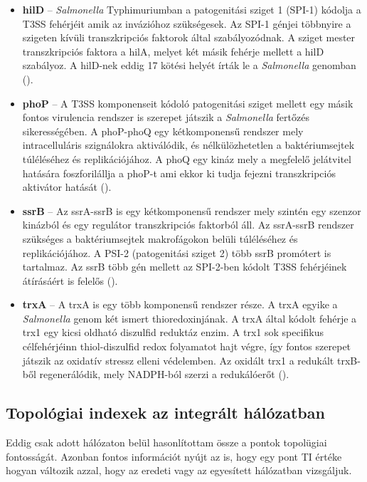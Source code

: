 \documentclass[a4paper,12pt]{article}
\begin{document}
			\begin{itemize}
				\item \textbf{hilD} -- \textit{Salmonella} Typhimuriumban a patogenitási sziget 1 (SPI-1) kódolja a T3SS fehérjéit amik az invázióhoz szükségesek. Az SPI-1 génjei többnyire a szigeten kívüli transzkripciós faktorok által szabályozódnak. A sziget mester transzkripciós faktora a hilA, melyet két másik fehérje mellett a hilD szabályoz. A hilD-nek eddig 17 kötési helyét írták le a \textit{Salmonella} genomban (\cite{hilD}). 

				\item \textbf{phoP} -- A T3SS komponenseit kódoló patogenitási sziget mellett egy másik fontos virulencia rendszer is szerepet játszik a \textit{Salmonella} fertőzés sikerességében. 
				A phoP-phoQ egy kétkomponensű rendszer mely intracelluláris szignálokra aktiválódik, és nélkülözhetetlen a baktériumsejtek túléléséhez és replikációjához. A phoQ egy kináz mely a megfelelő jelátvitel hatására foszforilállja a phoP-t ami ekkor ki tudja fejezni transzkripciós aktivátor hatását (\cite{phoP}). 
				
				\item \textbf{ssrB} -- Az ssrA-ssrB is egy kétkomponensű rendszer mely szintén egy szenzor kinázból és egy regulátor transzkripciós faktorból áll. Az ssrA-ssrB rendszer szükséges a baktériumsejtek makrofágokon belüli túléléséhez és replikációjához. A PSI-2 (patogenitási sziget 2) több ssrB promótert is tartalmaz. Az ssrB több gén mellett az SPI-2-ben kódolt T3SS fehérjéinek átírásáért is felelős (\cite{ssrB}). 
				
				\item \textbf{trxA} -- A trxA is egy több komponensű rendszer része. A trxA egyike a \textit{Salmonella} genom két ismert thioredoxinjának. A trxA által kódolt fehérje a trx1 egy kicsi oldható diszulfid reduktáz enzim.  A trx1 sok specifikus célfehérjéinn thiol-diszulfid redox folyamatot hajt végre, így fontos szerepet játszik az oxidatív stressz elleni védelemben. Az oxidált trx1 a redukált trxB-ből regenerálódik, mely NADPH-ból szerzi a redukálóerőt (\cite{trxA}). 
			\end{itemize}
			
	\subsection{Topológiai indexek az integrált hálózatban}
	
		Eddig csak adott hálózaton belül hasonlítottam össze a pontok topolügiai fontosságát. Azonban fontos információt nyújt az is, hogy egy pont TI értéke hogyan változik azzal, hogy az eredeti vagy az egyesített hálózatban vizsgáljuk.
	
\end{document}
